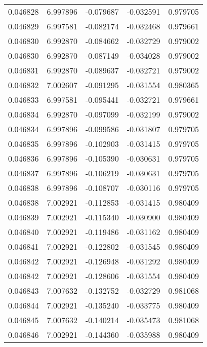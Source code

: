 \begin{tabular}{lrrrr}
0.046828    &  6.997896 & -0.079687 & -0.032591 &             0.979705 \\
0.046829    &  6.997581 & -0.082174 & -0.032468 &             0.979661 \\
0.046830    &  6.992870 & -0.084662 & -0.032729 &             0.979002 \\
0.046830    &  6.992870 & -0.087149 & -0.034028 &             0.979002 \\
0.046831    &  6.992870 & -0.089637 & -0.032721 &             0.979002 \\
0.046832    &  7.002607 & -0.091295 & -0.031554 &             0.980365 \\
0.046833    &  6.997581 & -0.095441 & -0.032721 &             0.979661 \\
0.046834    &  6.992870 & -0.097099 & -0.032199 &             0.979002 \\
0.046834    &  6.997896 & -0.099586 & -0.031807 &             0.979705 \\
0.046835    &  6.997896 & -0.102903 & -0.031415 &             0.979705 \\
0.046836    &  6.997896 & -0.105390 & -0.030631 &             0.979705 \\
0.046837    &  6.997896 & -0.106219 & -0.030631 &             0.979705 \\
0.046838    &  6.997896 & -0.108707 & -0.030116 &             0.979705 \\
0.046838    &  7.002921 & -0.112853 & -0.031415 &             0.980409 \\
0.046839    &  7.002921 & -0.115340 & -0.030900 &             0.980409 \\
0.046840    &  7.002921 & -0.119486 & -0.031162 &             0.980409 \\
0.046841    &  7.002921 & -0.122802 & -0.031545 &             0.980409 \\
0.046842    &  7.002921 & -0.126948 & -0.031292 &             0.980409 \\
0.046842    &  7.002921 & -0.128606 & -0.031554 &             0.980409 \\
0.046843    &  7.007632 & -0.132752 & -0.032729 &             0.981068 \\
0.046844    &  7.002921 & -0.135240 & -0.033775 &             0.980409 \\
0.046845    &  7.007632 & -0.140214 & -0.035473 &             0.981068 \\
0.046846    &  7.002921 & -0.144360 & -0.035988 &             0.980409 \\

\end{tabular}
